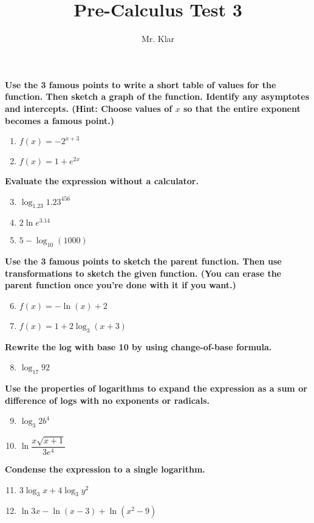 \documentclass[letterpaper]{article}
\title{Pre-Calculus \linebreak
Test 3}
\author{Mr. Klar}
\date{}
\begin{document}
\maketitle

\noindent	\textbf{Use the 3 famous points to write a short table of values for the function. Then sketch a graph of the function. Identify any asymptotes and intercepts. (Hint: Choose values of $x$ so that the entire exponent becomes a famous point.)}
\begin{enumerate}
	\item $f(x) = -2^{x+3}$ 
	\item $f(x) = 1+e^{2x}$
\end{enumerate}
\noindent	\textbf{Evaluate the expression without a calculator.}
\begin{enumerate}\setcounter{enumi}{2}
\item $\log_{1.23}{1.23}^{456}$
\item $2\ln e^{3.14}$
\item $5-\log_{10}(1000)$
\end{enumerate}
\noindent	\textbf{Use the 3 famous points to sketch the parent function. Then use transformations to sketch the given function. (You can erase the parent function once you're done with it if you want.)}
\begin{enumerate}\setcounter{enumi}{5}
\item $f(x) = -\ln(x)+2$
\item $f(x) = 1+2\log_{3}(x+3)$
\end{enumerate}
\noindent	\textbf{Rewrite the log with base 10 by using change-of-base formula.}
\begin{enumerate}\setcounter{enumi}{7}
\item $\log_{17} 92$
\end{enumerate}
\noindent	\textbf{Use the properties of logarithms to expand the expression as a sum or difference of logs with no exponents or radicals.}
\begin{enumerate}\setcounter{enumi}{8}
\item $\log_3 2b^4$
\item $\ln\dfrac{x\sqrt{x+1}}{3e^4}$
\end{enumerate}
\noindent	\textbf{Condense the expression to a single logarithm.}
\begin{enumerate}\setcounter{enumi}{10}
\item $3\log_3 x+4\log_3 y^2$
\item $\ln 3x -\ln(x-3) + \ln(x^2-9)$
\end{enumerate}
\end{document}
